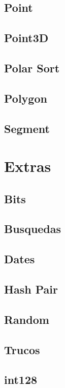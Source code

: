 \subsection{Point}
\raggedbottom
\hrulefill
\subsection{Point3D}
\raggedbottom
\hrulefill
\subsection{Polar Sort}
\raggedbottom
\hrulefill
\subsection{Polygon}
\raggedbottom
\hrulefill
\subsection{Segment}
\raggedbottom
\hrulefill
\newpage

\section{Extras}
\subsection{Bits}
\raggedbottom
\hrulefill
\subsection{Busquedas}
\raggedbottom
\hrulefill
\subsection{Dates}
\raggedbottom
\hrulefill
\subsection{Hash Pair}
\raggedbottom
\hrulefill
\subsection{Random}
\raggedbottom
\hrulefill
\subsection{Trucos}
\raggedbottom
\hrulefill
\subsection{int128}
\raggedbottom
\hrulefill
\newpage

